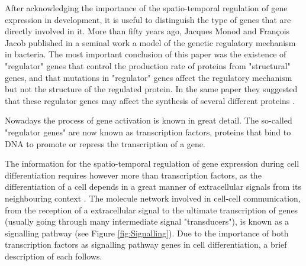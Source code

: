 After acknowledging the importance of the spatio-temporal regulation of gene expression in development, it is useful to distinguish the type of genes that are directly involved in it.
More than fifty years ago, Jacques Monod and Fran\c cois Jacob \citep{Jacob1961} published in a seminal work a model of the genetic regulatory mechanism in bacteria.
The most important conclusion of this paper was the existence of "regulator" genes that control the production rate of proteins from "structural" genes, and that mutations in "regulator" genes affect the regulatory mechanism but not the structure of the regulated protein. In the same paper they suggested that these regulator genes may affect the synthesis of several different proteins \citep{Jacob1961}.

Nowadays the process of gene activation is known in great detail. The so-called "regulator genes" are now known as transcription factors, proteins that bind to DNA to promote or repress the transcription of a gene. 

The information for the spatio-temporal regulation of gene expression during cell differentiation requires however more than transcription factors, as the differentiation of a cell depends in a great manner of extracellular signals from its neighbouring context \citep{Gilbert2014}.
The molecule network involved in cell-cell communication, from the reception of a extracellular signal to the ultimate transcription of genes (usually going through many intermediate signal "transducers"), is known as a signalling pathway (see Figure \ref{fig:Signalling}).
Due to the importance of both transcription factors as signalling pathway genes in cell differentiation, a brief description of each follows.

